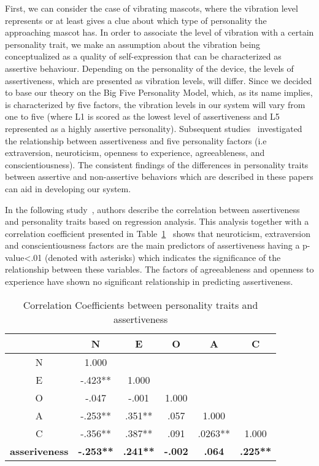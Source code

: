 First, we can consider the case of vibrating mascots, where the vibration level
represents or at least gives a clue about which type of personality the approaching mascot has.
In order to associate the level of vibration with a certain personality trait,
we make an assumption about the vibration being conceptualized as a quality of self-expression
that can be characterized as assertive behaviour.
Depending on the personality of the device, the levels of assertiveness,
which are presented as vibration levels, will differ.
Since we decided to base our theory on the Big Five Personality Model, which, as its name implies, is characterized
by five factors, the vibration levels in our system will vary from one to five (where L1 is scored
as the lowest level of assertiveness and L5 represented as a highly assertive personality).
Subsequent studies~\cite{bagherian2016relationship,kirst2011investigating,ramanaiah1993neo,lefevre1981assertiveness}
investigated the relationship between assertiveness and five personality factors (i.e extraversion, neuroticism,
openness to experience, agreeableness, and conscientiousness).
The consistent findings of the differences in personality traits between assertive and
non-assertive behaviors which are described in these papers can aid in developing our system.

In the following study~\cite{bagherian2016relationship}, authors describe the correlation between
assertiveness and personality traits based on regression analysis.
This analysis together with a correlation coefficient
presented in Table~\ref{table:assertiveness}~\cite{bagherian2016relationship} shows that neuroticism,
extraversion and conscientiousness factors are the main predictors of assertiveness
having a p-value\textless .01 (denoted with asterisks) which indicates the significance of the
relationship between these variables.
The factors of agreeableness and openness to experience have shown
no significant relationship in predicting assertiveness.

\begin{table} [h]
\centering
\begin{tabular}{c c c c c c} 
\\
 \hline \hline
						& \textbf{N} 			&\textbf{E}		&\textbf{O}		&\textbf{A}		&\textbf{C}	\\ [0.5ex]
 \hline
 N 						& 1.000 				&				&				&				&	\\ 
 E 						& -.423** 			&1.000			&				&				&	\\
 O 						& -.047 			&-.001			&1.000			&				&	\\
 A 						& -.253** 			&.351**			&.057			&1.000			&	\\
 C 						& -.356** 			&.387**			&.091			&.0263**		&1.000	\\ [1ex]
 \hline
 \textbf{asseriveness}  		& \textbf{-.253**}		&\textbf{.241**}	&\textbf{-.002}		&\textbf{.064}		&\textbf{.225**}	\\
 \hline \hline
 \end{tabular}
\caption{Correlation Coefficients between personality traits and assertiveness}
 \label{table:assertiveness}
 \end{table}
 

